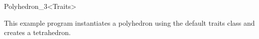 \begin{ccRefClass}{Polyhedron_3<Traits>}
\ccExample


This example program instantiates a polyhedron using the default
traits class and creates a tetrahedron.


\end{ccRefClass}

\ccRefPageEnd

